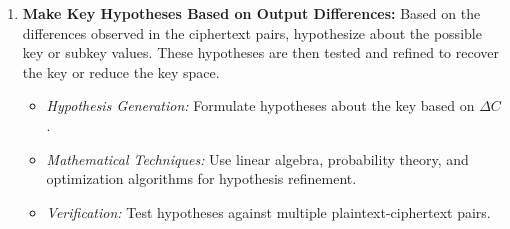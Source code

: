 \begin{enumerate}
	\item \textbf{Make Key Hypotheses Based on Output Differences:} Based on the differences observed in the ciphertext pairs, hypothesize about the possible key or subkey values. These hypotheses are then tested and refined to recover the key or reduce the key space.
	\begin{itemize}
		\item \textit{Hypothesis Generation:} Formulate hypotheses about the key based on \(\Delta C\).
		\item \textit{Mathematical Techniques:} Use linear algebra, probability theory, and optimization algorithms for hypothesis refinement.
		\item \textit{Verification:} Test hypotheses against multiple plaintext-ciphertext pairs.
	\end{itemize}
\end{enumerate}

